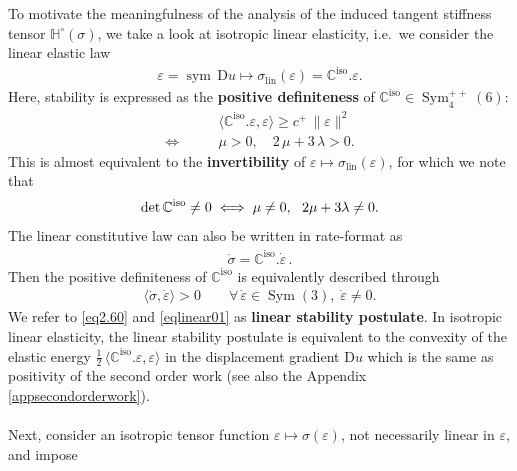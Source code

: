 \documentclass[10pt]{article}
\numberwithin{theoremCounter}{section}
\theoremstyle{plain}
\theoremstyle{definition}
\newcommand{\norm}[1]{\lVert #1 \rVert}
\newcommand{\DD}{\mathrm{D}}
\DeclareMathOperator{\lin}{lin}
\DeclareMathOperator{\Sym}{Sym}
\DeclareMathOperator{\sym}{sym}
\DeclareMathOperator{\iso}{iso}
\def\C{\mathbb{C}}
\def\H{\mathbb{H}}
\numberwithin{equation}{section}
\begin{document}
To motivate the meaningfulness of the analysis of the induced tangent stiffness tensor $\H^{\circ}(\sigma)$, we take a look at isotropic linear elasticity, i.e.~we consider the linear elastic law
	\begin{align}
	\varepsilon = \sym \, \DD u \mapsto \sigma_{\lin}(\varepsilon) = \C^{\iso}.\varepsilon.
	\end{align}
Here, stability is expressed as the \textbf{positive definiteness} of $\C^{\iso} \in \Sym^{++}_4(6)$:
	\begin{equation}
	\label{eq2.60}
	\begin{alignedat}{2}
	&\langle \C^{\iso}.\varepsilon, \varepsilon \rangle \ge c^+ \, \norm{\varepsilon}^2 \\
	\iff \qquad &\mu>0, \quad 2 \, \mu + 3 \, \lambda > 0.
	\end{alignedat}
	\end{equation}
This is almost equivalent to the \textbf{invertibility} of \break $\varepsilon \mapsto \sigma_{\lin}(\varepsilon)$, for which we note that
	\begin{align}
	\det \C^{\rm iso}\neq 0\iff \mu\neq 0, \ \ 2\mu+3\lambda\neq 0.
	\end{align}
The linear constitutive law can also be written in rate-format as
	\begin{align}
	\dot \sigma = \C^{\iso}.\dot \varepsilon\,.
	\end{align}
Then the positive definiteness of $\C^{\iso}$ is equivalently described through 
	\begin{align}
	\label{eqlinear01}
	\langle \dot \sigma, \dot \varepsilon \rangle > 0 \qquad \forall \, \dot \varepsilon \in \Sym(3), \; \dot \varepsilon \neq 0.
	\end{align}
We refer to \eqref{eq2.60} and \eqref{eqlinear01} as {\bf linear stability postulate}. In isotropic linear elasticity, the linear stability postulate is equivalent to the convexity of the elastic energy $\frac12 \, \langle \C^{\iso}.\varepsilon, \varepsilon \rangle$ in the displacement gradient $\DD u$ which is the same as positivity of the second order work (see also the Appendix \ref{appsecondorderwork}). \\
\\
Next, consider an isotropic tensor function $\varepsilon \mapsto \sigma(\varepsilon)$, not necessarily linear in $\varepsilon$, and impose
\end{document}
